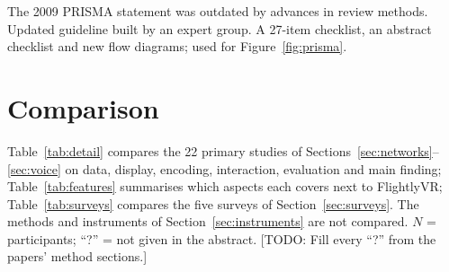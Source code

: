 \documentclass[11pt,a4paper]{article}
\newif\ifshowtodos \showtodostrue
\newcommand{\todo}[2][]{\ifshowtodos{\color{red}\footnotesize[TODO: #2]}\fi}
\newcommand{\system}{FlightlyVR}
\begin{document}
\prob The 2009 PRISMA statement was outdated by advances in review methods.
\meth Updated guideline built by an expert group.
\res A 27-item checklist, an abstract checklist and new flow diagrams; used for
Figure~\ref{fig:prisma}.

\section{Comparison}
\label{sec:comparison}

Table~\ref{tab:detail} compares the 22 primary studies of
Sections~\ref{sec:networks}--\ref{sec:voice} on data, display, encoding, interaction,
evaluation and main finding; Table~\ref{tab:features} summarises which aspects each covers
next to \system{}; Table~\ref{tab:surveys} compares the five surveys of
Section~\ref{sec:surveys}. The methods and instruments of Section~\ref{sec:instruments} are
not compared. $N$ = participants; ``?'' = not given in the abstract.
\todo{Fill every ``?'' from the papers' method sections.}
\end{document}

